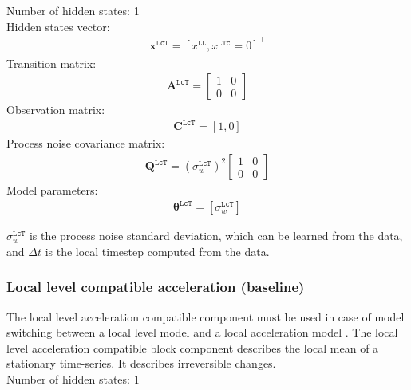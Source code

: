\noindent
Number of hidden states: 1\\

Hidden states vector: 
\begin{gather*}
 \mathbf{x}^{\mathtt{LcT}} = [x^{\mathtt{LL}}, x^{\mathtt{LTc}}=0]^{\intercal}
 \end{gather*}
Transition matrix: 
\begin{gather*}
\mathbf{A}^{\mathtt{LcT}}= \left[\begin{array}{cc}1 & 0\\0&0\end{array}\right]
\end{gather*}
Observation matrix: 
\begin{gather*}
\mathbf{C}^{\mathtt{LcT}}=[1, 0]
\end{gather*}
Process noise covariance matrix: 
\begin{gather*}
\mathbf{Q}^{\mathtt{LcT}}=(\sigma_{w}^{\mathtt{LcT}})^{2}\left[\begin{array}{cc}1 &0\\0&0\end{array}\right]
\end{gather*}
Model parameters: 
\begin{gather*}
\bm\theta^{\mathtt{LcT}}=[\sigma_{w}^{\mathtt{LcT}} ]
\end{gather*}

\noindent
$\sigma_{w}^{\mathtt{LcT}}$ is the process noise standard deviation, which can be learned from the data, and $\Delta t$ is the local timestep computed from the data.

\subsubsection{Local level compatible acceleration (baseline)}

The local level acceleration compatible component must be used in case of model switching between a local level model and a local acceleration model \cite{Nguyen2018}.
The local level acceleration compatible block component describes the local mean of a stationary time-series.
It describes irreversible changes.\\

\noindent
Number of hidden states: 1\\

